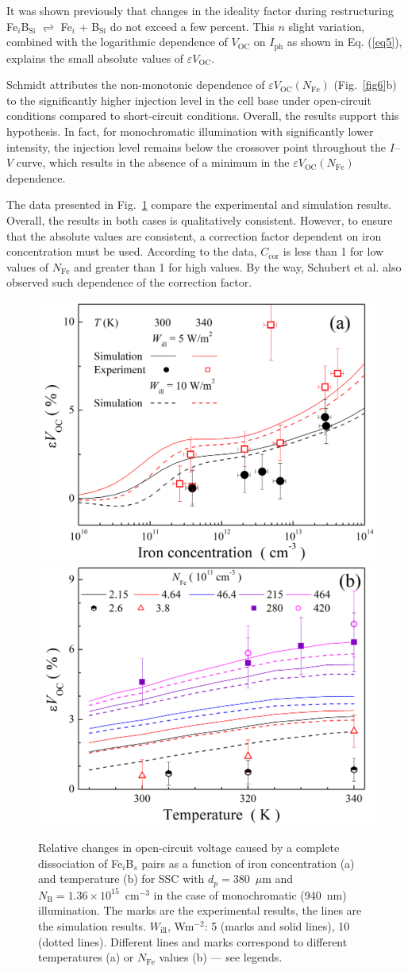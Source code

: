 \documentclass[a4paper,fleqn]{cas-sc}
\begin{document}
It was shown \cite{Olikh2022PPV,Olikh2019SM} previously
that changes in the ideality factor during restructuring Fe$_i$B$_\mathrm{Si}$ $\rightleftharpoons$ Fe$_i$ + B$_\mathrm{Si}$ do not exceed a few percent.
This $n$ slight variation, combined with the logarithmic dependence of $V_\mathrm{OC}$ on $I_\mathrm{ph}$ as shown in Eq. (\ref{eq5}),
explains the small absolute values of $\varepsilon V_\mathrm{OC}$.

Schmidt \cite{FeB:Schmidt} attributes the non-monotonic dependence of $\varepsilon V_\mathrm{OC}\left(N_\mathrm{Fe}\right)$
(Fig.~\ref{fig6}b) to the significantly higher injection level in the cell base under open-circuit conditions
compared to short-circuit conditions.
Overall, the results support this hypothesis.
In fact,
for monochromatic illumination with significantly lower intensity,
the injection level remains below the crossover point \cite{FeB:Schmidt} throughout the $I$--$V$ curve,
which results in the absence of a minimum in the $\varepsilon V_\mathrm{OC}\left(N_\mathrm{Fe}\right)$ dependence.

The data presented in Fig.~\ref{fig7} compare the experimental and simulation results.
Overall, the results in both cases is qualitatively consistent.
However, to ensure that the absolute values are consistent, a correction factor dependent on iron concentration must be used.
According to the data, $C_\mathrm{cor}$ is less than 1 for low values of $N_\mathrm{Fe}$ and greater than 1 for high values.
By the way, Schubert et al. \cite{IronSC} also observed such dependence of the correction factor.

\begin{figure}
	\centering
     \includegraphics[width=0.4\linewidth]{Fig7a.png}
     \includegraphics[width=0.4\linewidth]{Fig7b.png}
	  \caption{Relative changes in open-circuit voltage caused by a complete
       dissociation of Fe$_i$B$_s$ pairs as a function of iron concentration (a) and
       temperature (b) for SSC with $d_p=380$~$\mu$m and $N_\mathrm{B}=1.36\times10^{15}$~cm$^{-3}$
       in the case of monochromatic (940~nm) illumination.
       The marks are the experimental results, the lines are the simulation results.
       $W_\mathrm{ill}$, Wm$^{-2}$: 5 (marks and solid lines), 10 (dotted lines).
       Different lines and marks correspond to different temperatures (a) or $N_\mathrm{Fe}$ values (b) --- see legends.
}\label{fig7}
\end{figure}
\end{document}
